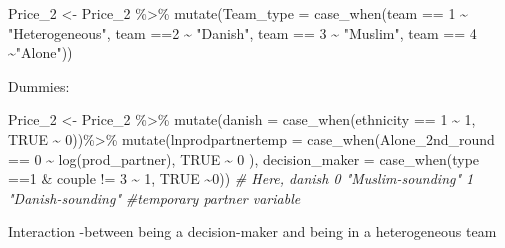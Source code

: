 \documentclass[
]{article}
\newenvironment{Shaded}{\begin{snugshade}}{\end{snugshade}}
\newcommand{\AttributeTok}[1]{\textcolor[rgb]{0.77,0.63,0.00}{#1}}
\newcommand{\CommentTok}[1]{\textcolor[rgb]{0.56,0.35,0.01}{\textit{#1}}}
\newcommand{\ConstantTok}[1]{\textcolor[rgb]{0.00,0.00,0.00}{#1}}
\newcommand{\DecValTok}[1]{\textcolor[rgb]{0.00,0.00,0.81}{#1}}
\newcommand{\FunctionTok}[1]{\textcolor[rgb]{0.00,0.00,0.00}{#1}}
\newcommand{\NormalTok}[1]{#1}
\newcommand{\OtherTok}[1]{\textcolor[rgb]{0.56,0.35,0.01}{#1}}
\newcommand{\SpecialCharTok}[1]{\textcolor[rgb]{0.00,0.00,0.00}{#1}}
\newcommand{\StringTok}[1]{\textcolor[rgb]{0.31,0.60,0.02}{#1}}
\begin{document}
\begin{Shaded}
\begin{Highlighting}[]
\NormalTok{Price\_2 }\OtherTok{\textless{}{-}}\NormalTok{ Price\_2 }\SpecialCharTok{\%\textgreater{}\%}
  \FunctionTok{mutate}\NormalTok{(}\AttributeTok{Team\_type =} \FunctionTok{case\_when}\NormalTok{(team }\SpecialCharTok{==} \DecValTok{1} \SpecialCharTok{\textasciitilde{}} \StringTok{"Heterogeneous"}\NormalTok{, team }\SpecialCharTok{==}\DecValTok{2} \SpecialCharTok{\textasciitilde{}} \StringTok{"Danish"}\NormalTok{, team }\SpecialCharTok{==} \DecValTok{3} \SpecialCharTok{\textasciitilde{}} \StringTok{"Muslim"}\NormalTok{, team }\SpecialCharTok{==} \DecValTok{4} \SpecialCharTok{\textasciitilde{}}\StringTok{"Alone"}\NormalTok{))}
\end{Highlighting}
\end{Shaded}

Dummies:

\begin{Shaded}
\begin{Highlighting}[]
\NormalTok{Price\_2 }\OtherTok{\textless{}{-}}\NormalTok{ Price\_2 }\SpecialCharTok{\%\textgreater{}\%}
  \FunctionTok{mutate}\NormalTok{(}\AttributeTok{danish =} \FunctionTok{case\_when}\NormalTok{(ethnicity }\SpecialCharTok{==} \DecValTok{1} \SpecialCharTok{\textasciitilde{}} \DecValTok{1}\NormalTok{, }\ConstantTok{TRUE} \SpecialCharTok{\textasciitilde{}} \DecValTok{0}\NormalTok{))}\SpecialCharTok{\%\textgreater{}\%}
  \FunctionTok{mutate}\NormalTok{(}\AttributeTok{lnprodpartnertemp =} \FunctionTok{case\_when}\NormalTok{(Alone\_2nd\_round }\SpecialCharTok{==} \DecValTok{0} \SpecialCharTok{\textasciitilde{}} \FunctionTok{log}\NormalTok{(prod\_partner), }\ConstantTok{TRUE} \SpecialCharTok{\textasciitilde{}} \DecValTok{0}\NormalTok{ ),}
         \AttributeTok{decision\_maker =} \FunctionTok{case\_when}\NormalTok{(type }\SpecialCharTok{==}\DecValTok{1} \SpecialCharTok{\&}\NormalTok{ couple }\SpecialCharTok{!=} \DecValTok{3} \SpecialCharTok{\textasciitilde{}} \DecValTok{1}\NormalTok{, }\ConstantTok{TRUE} \SpecialCharTok{\textasciitilde{}}\DecValTok{0}\NormalTok{))}
\CommentTok{\# Here, danish 0 "Muslim{-}sounding" 1 "Danish{-}sounding"}
\CommentTok{\#temporary partner variable}
\end{Highlighting}
\end{Shaded}

Interaction -between being a decision-maker and being in a heterogeneous
team
\end{document}
